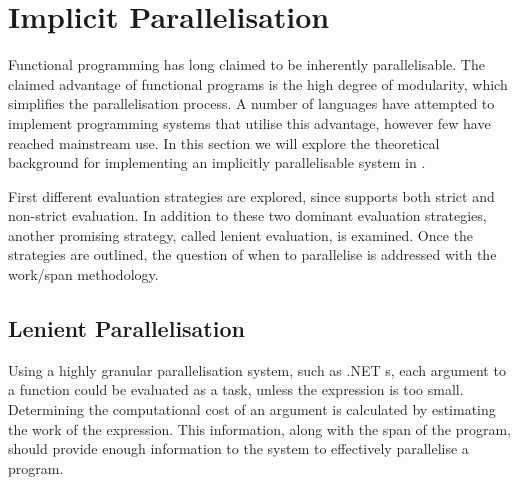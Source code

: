 \section{Implicit Parallelisation}\label{sec:implicit-para}
Functional programming has long claimed to be inherently parallelisable\cite{hudak1986functional, loidl1998granularity}. The claimed advantage of functional programs is the high degree of modularity, which simplifies the parallelisation process. A number of languages have attempted to implement programming systems that utilise this advantage, however few have reached mainstream use. In this section we will explore the theoretical background for implementing an implicitly parallelisable system in \fs.

First different evaluation strategies are explored, since \fs supports both strict and non-strict evaluation. In addition to these two dominant evaluation strategies, another promising strategy, called lenient evaluation, is examined. Once the strategies are outlined, the question of when to parallelise is addressed with the work/span methodology.




\subsection{Lenient Parallelisation}
Using a highly granular parallelisation system, such as .NET s, each argument to a function could be evaluated as a task, unless the expression is too small. Determining the computational cost of an argument is calculated by estimating the work of the expression. This information, along with the span of the program, should provide enough information to the system to effectively parallelise a \fs program.
